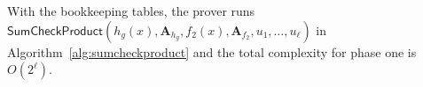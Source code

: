 {%
%
%
%
%	



With the bookkeeping tables, the prover runs $\textsf{SumCheckProduct}(h_g(x), \textbf{A}_{h_g},f_2(x),\textbf{A}_{f_2}, u_1,\ldots,u_\ell)$ in Algorithm~\ref{alg:sumcheckproduct} and the total complexity for phase one is $O(2^\ell)$.

}
